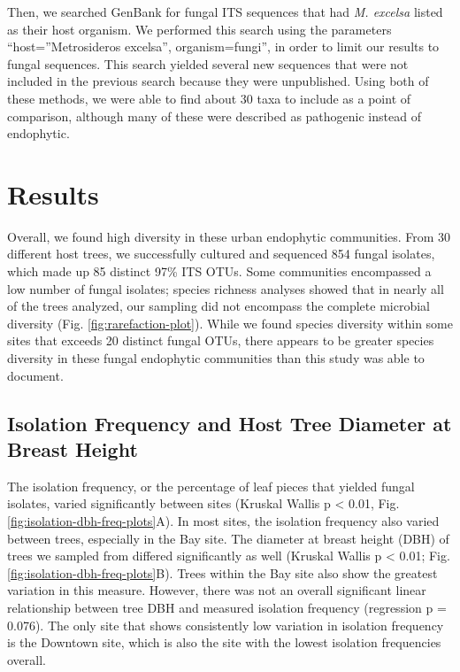 \documentclass[fleqn,10pt,lineno]{wlpeerj} %
\begin{document}
Then, we searched GenBank for fungal ITS sequences that had \emph{M. excelsa} listed as their host organism. We performed this search using the parameters ``host=''Metrosideros excelsa'', organism=fungi'', in order to limit our results to fungal sequences. This search yielded several new sequences that were not included in the previous search because they were unpublished. Using both of these methods, we were able to find about 30 taxa to include as a point of comparison, although many of these were described as pathogenic instead of endophytic.

\hypertarget{results}{%
\section*{Results}\label{results}}

Overall, we found high diversity in these urban endophytic communities. From 30 different host trees, we successfully cultured and sequenced 854 fungal isolates, which made up 85 distinct 97\% ITS OTUs. Some communities encompassed a low number of fungal isolates; species richness analyses showed that in nearly all of the trees analyzed, our sampling did not encompass the complete microbial diversity (Fig. \ref{fig:rarefaction-plot}). While we found species diversity within some sites that exceeds 20 distinct fungal OTUs, there appears to be greater species diversity in these fungal endophytic communities than this study was able to document.

\hypertarget{isolation-frequency-and-host-tree-diameter-at-breast-height}{%
\subsection*{Isolation Frequency and Host Tree Diameter at Breast Height}\label{isolation-frequency-and-host-tree-diameter-at-breast-height}}

The isolation frequency, or the percentage of leaf pieces that yielded fungal isolates, varied significantly between sites (Kruskal Wallis p \textless{} 0.01, Fig. \ref{fig:isolation-dbh-freq-plots}A). In most sites, the isolation frequency also varied between trees, especially in the Bay site. The diameter at breast height (DBH) of trees we sampled from differed significantly as well (Kruskal Wallis p \textless{} 0.01; Fig. \ref{fig:isolation-dbh-freq-plots}B). Trees within the Bay site also show the greatest variation in this measure. However, there was not an overall significant linear relationship between tree DBH and measured isolation frequency (regression p = 0.076). The only site that shows consistently low variation in isolation frequency is the Downtown site, which is also the site with the lowest isolation frequencies overall.
\end{document}
